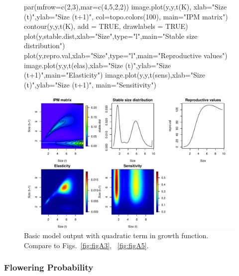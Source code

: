 \documentclass[11pt]{article}
\begin{document}
\begin{figure}[H]
\begin{center}
\begin{Schunk}
\begin{Sinput}
     par(mfrow=c(2,3),mar=c(4,5,2,2)) 
     image.plot(y,y,t(K), xlab="Size (t)",ylab="Size (t+1)",
        col=topo.colors(100), main="IPM matrix")
     contour(y,y,t(K), add = TRUE, drawlabels = TRUE)
     plot(y,stable.dist,xlab="Size",type="l",main="Stable size distribution")
     plot(y,repro.val,xlab="Size",type="l",main="Reproductive values") 
     image.plot(y,y,t(elas),xlab="Size (t)",ylab="Size (t+1)",main="Elasticity")
     image.plot(y,y,t(sens),xlab="Size (t)",ylab="Size (t+1)", main="Sensitivity")
\end{Sinput}
\end{Schunk}
\includegraphics{IPM_Guide_Appendix_A-fig6}
\caption{Basic model output with quadratic term in growth function. Compare to Figs.~\ref{fig:figA3}, ~\ref{fig:figA5}.}
\label{fig:figA6}
\end{center}
\end{figure}
  

\subsubsection{Flowering Probability}
\label{subsec:Flowering Probability}
\end{document}
